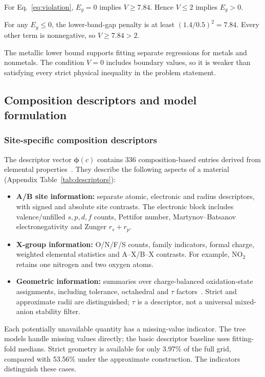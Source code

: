 \begin{proposition}\label{prop:metal}
For Eq.~\eqref{eq:violation}, $E_g=0$ implies $V\ge7.84$. Hence $V\le2$ implies $E_g>0$.
\end{proposition}
\begin{p1proof}
For any $E_g\le0$, the lower-band-gap penalty is at least $(1.4/0.5)^2=7.84$. Every other term is nonnegative, so $V\ge7.84>2$.
\end{p1proof}

The metallic lower bound supports fitting separate regressions for metals and nonmetals. The condition $V=0$ includes boundary values, so it is weaker than satisfying every strict physical inequality in the problem statement.

\subsection{Composition descriptors and model formulation}
\subsubsection{Site-specific composition descriptors}
The descriptor vector $\boldsymbol\phi(c)$ contains 336 composition-based entries derived from elemental properties~\cite{ward2016}. They describe the following aspects of a material (Appendix Table~\ref{tab:descriptors}):
\begin{itemize}
  \item \textbf{A/B site information:} separate atomic, electronic and radius descriptors, with signed and absolute site contrasts. The electronic block includes valence/unfilled $s,p,d,f$ counts, Pettifor number, Martynov--Batsanov electronegativity and Zunger $r_s+r_p$.
  \item \textbf{X-group information:} O/N/F/S counts, family indicators, formal charge, weighted elemental statistics and A--X/B--X contrasts. For example, $\mathrm{NO_2}$ retains one nitrogen and two oxygen atoms.
  \item \textbf{Geometric information:} summaries over charge-balanced oxidation-state assignments, including tolerance, octahedral and $\tau$ factors~\cite{bartel2019}. Strict and approximate radii are distinguished; $\tau$ is a descriptor, not a universal mixed-anion stability filter.
\end{itemize}

Each potentially unavailable quantity has a missing-value indicator. The tree models handle missing values directly; the basic descriptor baseline uses fitting-fold medians. Strict geometry is available for only 3.97\% of the full grid, compared with 53.56\% under the approximate construction. The indicators distinguish these cases.

